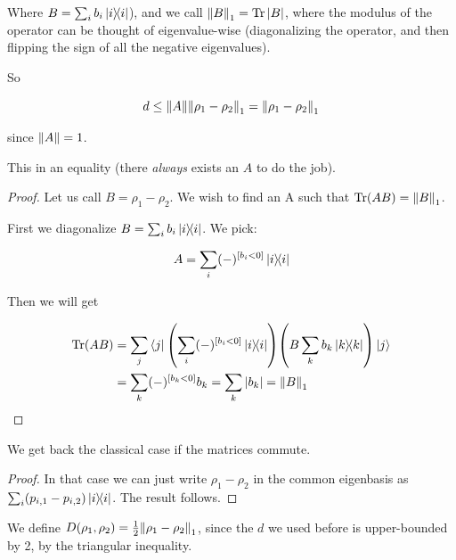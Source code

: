 \documentclass[main.tex]{subfiles}
\begin{document}
Where \(B = \sum_i b_i \ketbra{i}\)),
and we call \(\norm{B}_1 = \operatorname*{Tr} \abs{B}\), where the modulus of the operator can be thought of eigenvalue-wise (diagonalizing the operator, and then flipping the sign of all the negative eigenvalues).

So

\begin{equation}
  d \leq \norm{A} \norm{\rho_1 - \rho_2}_1 = \norm{\rho_1 - \rho_2}_1
\end{equation}

since \(\norm{A}=1\).

\begin{claim}
This in an equality (there \emph{always} exists an $A$ to do the job).
\end{claim}

\begin{proof}
Let us call \(B = \rho_1 - \rho_2\). We wish to find an A such that \(\operatorname*{Tr}(AB) = \norm{B}_1\).

First we diagonalize \(B = \sum_i b_i \dyad{i} \). We pick:

\begin{equation} \label{eq:optimal-operator-trace-norm}
    A = \sum _{i}  (-) ^{[b_i < 0]} \dyad{i}
\end{equation}

Then we will get

\begin{subequations}
\begin{align}
    \Tr (AB) &= \sum _j \bra{j}
    \qty(\sum _{i}  (-) ^{[b_i < 0]} \dyad{i})
    \qty(B \sum_k b_k \dyad{k})
    \ket{j} \\
    &= \sum_k (-) ^{[b_k < 0]} b_k
    = \sum _{k} \abs{b_k} = \norm{B}_1
\end{align}
\end{subequations}
\end{proof}

\begin{claim}
We get back the classical case if the matrices commute.
\end{claim}

\begin{proof}
In that case we can just write \(\rho_1 - \rho_2\) in the common eigenbasis as \(\sum _i (p_{i,1} - p_{i,2}) \dyad{i}\). The result follows.
\end{proof}

We define \(D(\rho_1, \rho_2) = \frac{1}{2} \norm{\rho_1 - \rho_2}_1\), since the $d$ we used before is upper-bounded by 2, by the triangular inequality.
\end{document}
